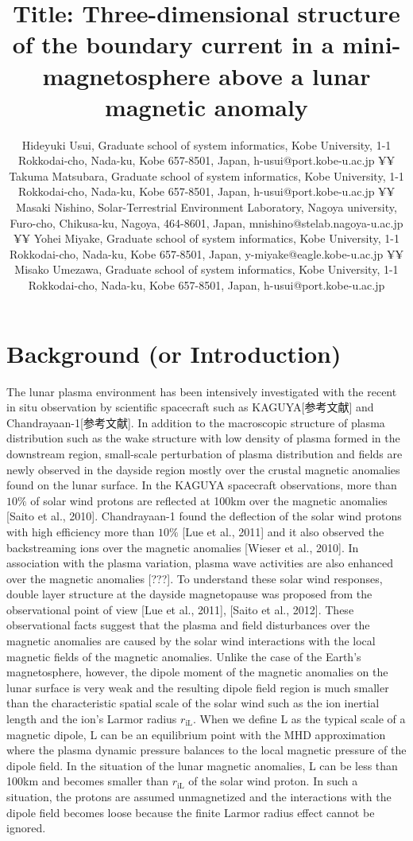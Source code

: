 \documentclass{EPS}
\title{Title: 
	Three-dimensional structure of the boundary current in a mini-magnetosphere above a lunar magnetic anomaly 
}
\author{
	Hideyuki Usui, 
	Graduate school of system informatics, Kobe University, 
	1-1 Rokkodai-cho, Nada-ku, Kobe 657-8501, Japan, h-usui@port.kobe-u.ac.jp ¥¥
	Takuma Matsubara, 
	Graduate school of system informatics, Kobe University, 
	1-1 Rokkodai-cho, Nada-ku, Kobe 657-8501, Japan, h-usui@port.kobe-u.ac.jp ¥¥
	Masaki Nishino, 
	Solar-Terrestrial Environment Laboratory, Nagoya university, 
	Furo-cho, Chikusa-ku, Nagoya, 464-8601, Japan, mnishino@stelab.nagoya-u.ac.jp  ¥¥
	Yohei Miyake, 
	Graduate school of system informatics, Kobe University, 
	1-1 Rokkodai-cho, Nada-ku, Kobe 657-8501, Japan, y-miyake@eagle.kobe-u.ac.jp ¥¥
	Misako Umezawa, 
	Graduate school of system informatics, Kobe University, 
	1-1 Rokkodai-cho, Nada-ku, Kobe 657-8501, Japan, h-usui@port.kobe-u.ac.jp
}
\begin{document}
\maketitle

\section{Background (or Introduction)}
The lunar plasma environment has been intensively investigated with the recent in situ observation 
by scientific spacecraft such as KAGUYA[参考文献] and Chandrayaan-1[参考文献]. 
In addition to the macroscopic structure of plasma distribution such as the wake structure 
with low density of plasma formed in the downstream region, small-scale perturbation of 
plasma distribution and fields are newly observed in the dayside region mostly 
over the crustal magnetic anomalies found on the lunar surface. 
In the KAGUYA spacecraft observations, more than $10 \%$ of solar wind protons are reflected 
at 100km over the magnetic anomalies [Saito et al., 2010]. 
Chandrayaan-1 found the deflection of the solar wind protons with high efficiency more than $ 10 \%$ [Lue et al., 2011]  
and it also observed the backstreaming ions over the magnetic anomalies [Wieser et al., 2010]. 
In association with the plasma variation, plasma wave activities are also enhanced over 
the magnetic anomalies [???].
To understand these solar wind responses, double layer structure at the dayside magnetopause was 
proposed from the observational point of view [Lue et al., 2011], [Saito et al., 2012]. 
These observational facts suggest that the plasma and field disturbances over 
the magnetic anomalies are caused by the solar wind interactions with the local magnetic fields of the magnetic anomalies. 
Unlike the case of the Earth’s magnetosphere, however, the dipole moment of 
the magnetic anomalies on the lunar surface is very weak and the resulting dipole field region 
is much smaller than the characteristic spatial scale of the solar wind such as 
the ion inertial length and the ion's Larmor radius 
$r_\mathrm{iL}$. 
When we define L as the typical scale of a magnetic dipole, 
L can be an equilibrium point with the MHD approximation where the plasma dynamic pressure balances 
to the local magnetic pressure of the dipole field. 
In the situation of the lunar magnetic anomalies, L can be less than 100km and 
becomes smaller than $r_\mathrm{iL}$ of the solar wind proton. 
In such a situation, the protons are assumed unmagnetized and the interactions with the dipole field becomes 
loose because the finite Larmor radius effect cannot be ignored. 
\end{document}
